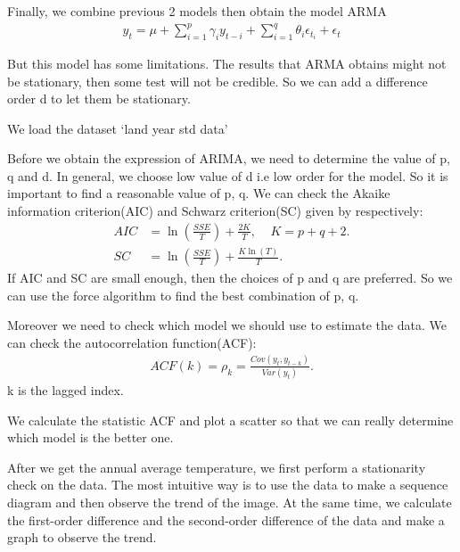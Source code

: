 \documentclass{apmcmthesis}
\begin{document}
Finally, we combine previous 2 models then obtain the model ARMA
\begin{align*}
  y_t = \mu + \sum^p_{i=1} \gamma_i y_{t-i}  + \sum^q_{i=1} \theta_i \epsilon_{t_i} + \epsilon_t
\end{align*}

But this model has some limitations.
The results that ARMA obtains might not be stationary, then some test will not be credible. 
So we can add a difference order d to let them be stationary. 

We load the dataset `land year std data'

Before we obtain the expression of ARIMA, we need to determine the value of p, q and d.
In general, we choose low value of d i.e low order for the model. 
So it is important to find a reasonable value of p, q.
We can check the Akaike information criterion(AIC) and Schwarz criterion(SC) 
given by respectively:
\begin{align*}
  AIC&=\ln(\frac{SSE}{T})+\frac{2K}{T},\;\;\;\;K=p+q+2.\\
  SC&=\ln(\frac{SSE}{T})+\frac{K\ln(T)}{T}.
\end{align*}
If AIC and SC are small enough, then the choices of p and q are preferred.
So we can use the force algorithm to find the best combination of p, q.

Moreover we need to check which model we should use to estimate the data.
We can check the autocorrelation function(ACF):
\begin{align*}
  ACF(k)=\rho_k = \frac{Cov(y_t,y_{t-k})}{Var(y_t)}.
\end{align*}
k is the lagged index.

We calculate the statistic ACF and plot a scatter so that we can really determine which model is the better one.

After we get the annual average temperature, we first perform a stationarity check on the data. The most intuitive way is to use the data to make a sequence diagram and then observe the trend of the image. At the same time, we calculate the first-order difference and the second-order difference of the data and make a graph to observe the trend.
\end{document}
